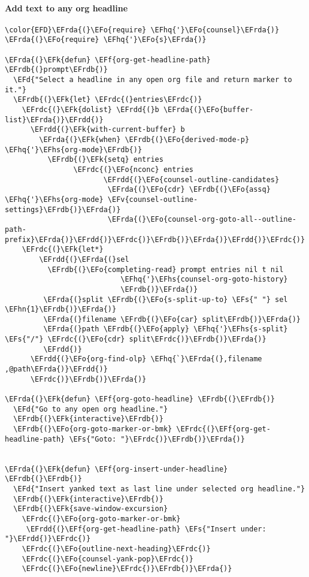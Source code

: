 \documentclass[a4wide,10pt]{article}
\newcommand{\EFs}[1]{\textcolor{EFs}{#1}} %
\newcommand{\EFd}[1]{\textcolor{EFd}{#1}} %
\newcommand{\EFk}[1]{\textcolor{EFk}{#1}} %
\newcommand{\EFf}[1]{\textcolor{EFf}{#1}} %
\newcommand{\EFv}[1]{\textcolor{EFv}{#1}} %
\newcommand{\EFo}[1]{\textcolor{EFo}{#1}} %
\newcommand{\EFhn}[1]{\textcolor{EFhn}{\textbf{#1}}} %
\newcommand{\EFhq}[1]{\textcolor{EFhq}{#1}} %
\newcommand{\EFhs}[1]{\textcolor{EFhs}{#1}} %
\newcommand{\EFrda}[1]{\textcolor{EFrda}{#1}} %
\newcommand{\EFrdb}[1]{\textcolor{EFrdb}{#1}} %
\newcommand{\EFrdc}[1]{\textcolor{EFrdc}{#1}} %
\newcommand{\EFrdd}[1]{\textcolor{EFrdd}{#1}} %
\begin{document}
\paragraph{Add text to any org headline}
\label{sec:orga1f9925}
\begin{Code}
\begin{Verbatim}
\color{EFD}\EFrda{(}\EFo{require} \EFhq{'}\EFo{counsel}\EFrda{)}
\EFrda{(}\EFo{require} \EFhq{'}\EFo{s}\EFrda{)}

\EFrda{(}\EFk{defun} \EFf{org-get-headline-path} \EFrdb{(}prompt\EFrdb{)}
  \EFd{"Select a headline in any open org file and return marker to it."}
  \EFrdb{(}\EFk{let} \EFrdc{(}entries\EFrdc{)}
    \EFrdc{(}\EFk{dolist} \EFrdd{(}b \EFrda{(}\EFo{buffer-list}\EFrda{)}\EFrdd{)}
      \EFrdd{(}\EFk{with-current-buffer} b
        \EFrda{(}\EFk{when} \EFrdb{(}\EFo{derived-mode-p} \EFhq{'}\EFhs{org-mode}\EFrdb{)}
          \EFrdb{(}\EFk{setq} entries
                \EFrdc{(}\EFo{nconc} entries
                       \EFrdd{(}\EFo{counsel-outline-candidates}
                        \EFrda{(}\EFo{cdr} \EFrdb{(}\EFo{assq} \EFhq{'}\EFhs{org-mode} \EFv{counsel-outline-settings}\EFrdb{)}\EFrda{)}
                        \EFrda{(}\EFo{counsel-org-goto-all--outline-path-prefix}\EFrda{)}\EFrdd{)}\EFrdc{)}\EFrdb{)}\EFrda{)}\EFrdd{)}\EFrdc{)}
    \EFrdc{(}\EFk{let*}
        \EFrdd{(}\EFrda{(}sel
          \EFrdb{(}\EFo{completing-read} prompt entries nil t nil
                           \EFhq{'}\EFhs{counsel-org-goto-history}
                           \EFrdb{)}\EFrda{)}
         \EFrda{(}split \EFrdb{(}\EFo{s-split-up-to} \EFs{" "} sel \EFhn{1}\EFrdb{)}\EFrda{)}
         \EFrda{(}filename \EFrdb{(}\EFo{car} split\EFrdb{)}\EFrda{)}
         \EFrda{(}path \EFrdb{(}\EFo{apply} \EFhq{'}\EFhs{s-split} \EFs{"/"} \EFrdc{(}\EFo{cdr} split\EFrdc{)}\EFrdb{)}\EFrda{)}
         \EFrdd{)}
      \EFrdd{(}\EFo{org-find-olp} \EFhq{`}\EFrda{(},filename ,@path\EFrda{)}\EFrdd{)}
      \EFrdc{)}\EFrdb{)}\EFrda{)}

\EFrda{(}\EFk{defun} \EFf{org-goto-headline} \EFrdb{(}\EFrdb{)}
  \EFd{"Go to any open org headline."}
  \EFrdb{(}\EFk{interactive}\EFrdb{)}
  \EFrdb{(}\EFo{org-goto-marker-or-bmk} \EFrdc{(}\EFf{org-get-headline-path} \EFs{"Goto: "}\EFrdc{)}\EFrdb{)}\EFrda{)}


\EFrda{(}\EFk{defun} \EFf{org-insert-under-headline} \EFrdb{(}\EFrdb{)}
  \EFd{"Insert yanked text as last line under selected org headline."}
  \EFrdb{(}\EFk{interactive}\EFrdb{)}
  \EFrdb{(}\EFk{save-window-excursion}
    \EFrdc{(}\EFo{org-goto-marker-or-bmk}
     \EFrdd{(}\EFf{org-get-headline-path} \EFs{"Insert under: "}\EFrdd{)}\EFrdc{)}
    \EFrdc{(}\EFo{outline-next-heading}\EFrdc{)}
    \EFrdc{(}\EFo{counsel-yank-pop}\EFrdc{)}
    \EFrdc{(}\EFo{newline}\EFrdc{)}\EFrdb{)}\EFrda{)}


\end{Verbatim}
\end{Code}
\end{document}
